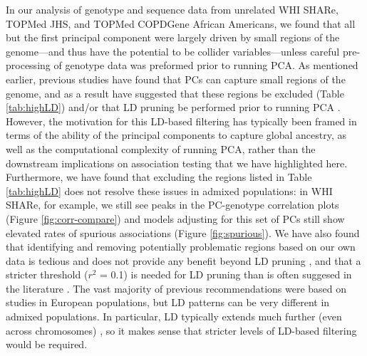 \documentclass[12pt]{article}
\newcommand{\edit}[1]{{\color{red}{#1}}}
\newcommand{\add}[1]{{\color{red}{[... #1 ...]}}}
\begin{document}
In our analysis of genotype and sequence data from unrelated WHI SHARe, TOPMed JHS, and TOPMed COPDGene African Americans, we found that all but the first principal component were largely driven by small regions of the genome---and thus have the potential to be collider variables---unless careful pre-processing of genotype data was preformed prior to running PCA.
As mentioned earlier, previous studies have found that PCs can capture small regions of the genome, and as a result have suggested that these regions be excluded (Table \ref{tab:highLD}) and/or that LD pruning be performed prior to running PCA \add{CITE}.
However, the motivation for this LD-based filtering has typically been framed in terms of the ability of the principal components to capture global ancestry, as well as the computational complexity of running PCA, rather than the downstream implications on association testing that we have highlighted here.
Furthermore, we have found that excluding the regions listed in Table \ref{tab:highLD} does not resolve these issues in admixed populations: in WHI SHARe, for example, we still see peaks in the PC-genotype correlation plots (Figure \ref{fig:corr-compare}) and models adjusting for this set of PCs still show elevated rates of spurious associations (Figure \ref{fig:spurious}).
We have also found that identifying  and removing potentially problematic regions based on our own data is tedious and does not provide any benefit beyond LD pruning \add{CITE appendix}, and that a stricter threshold ($r^2$ = 0.1) is needed for LD pruning than is often suggesed in the literature \add{CITE appendix}.
The vast majority of previous recommendations were based on studies in European populations, but LD patterns can be very different in admixed populations. 
In particular, LD typically extends much further (even across chromosomes) \add{CITE 147, 148}, so it makes sense that stricter levels of LD-based filtering would be required.
\edit{\begin{itemize}
\item note, too, that even strict LD pruning doesn't seem to remove all correlation between SNPs and genotypes (e.g., later PCs in WHI, TOPMed COPDGene)
\end{itemize}}
\end{document}
